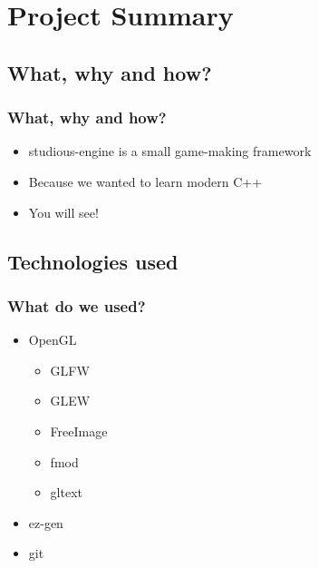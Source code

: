\documentclass{beamer}
\begin{document}
\section{Project Summary}

\subsection{What, why and how?}

\begin{frame}
\frametitle{What, why and how?}
\begin{itemize}
\item studious-engine is a small game-making framework
\item Because we wanted to learn modern C++
\item You will see!
\end{itemize}
\end{frame}

\subsection{Technologies used}
\begin{frame}
\frametitle{What do we used?}
\begin{itemize}
\item OpenGL
    \begin {itemize}
    \item GLFW
    \item GLEW
    \item FreeImage
    \item fmod
    \item gltext
    \end {itemize}
\item ez-gen
\item git
\end{itemize}
\end{frame}

\end{document}
